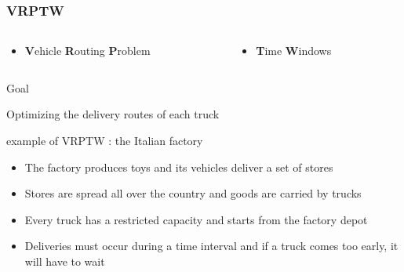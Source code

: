 \documentclass{beamer}
\begin{document}
\begin{frame}
\frametitle{VRPTW\cite{Berbeglia07}}
	\begin{columns}
	 	\begin{column}[l]{6cm} \begin{center}
			\begin{itemize}
 				\item \textbf{V}ehicle \textbf{R}outing \textbf{P}roblem
			\end{itemize} \end{center}
	 	\end{column}
	 	\begin{column}[r]{6cm} \begin{center}
			\begin{itemize} 
				\item \textbf{T}ime \textbf{W}indows
			\end{itemize} \end{center}
	 	\end{column}
	\end{columns}
	\begin{block}{Goal}
		\begin{center} Optimizing the delivery routes of each truck \end{center}
	\end{block}
		
	\begin{exampleblock}{example of VRPTW : the Italian factory}
		\begin{itemize}
			\item The factory produces toys and its vehicles deliver a set of stores
			\item Stores are spread all over the country and goods are carried by trucks
			\item Every truck has a restricted capacity and starts from the factory depot
			\item Deliveries must occur during a time interval and if a truck comes too early, it will have to wait
		\end{itemize}
	\end{exampleblock}
\end{frame}
\end{document}
